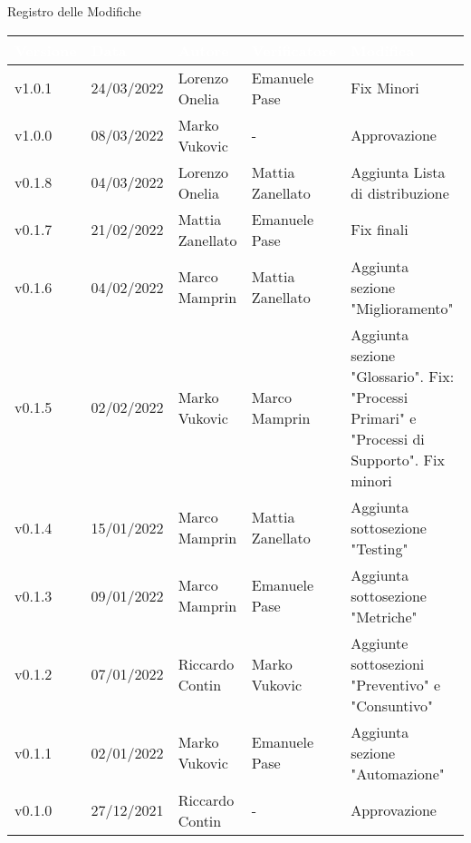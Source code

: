 \begin{center}
  \huge{Registro delle Modifiche}
\end{center}

\renewcommand\arraystretch{1,5}
{\centering
\begin{longtable}{|C{1.8cm}|C{2.1cm}|C{2cm}|C{2.4cm}|L{4.4cm}|}
  \hline
  \textcolor[HTML]{FFFFFF}{\textbf{Versione}} & \textcolor[HTML]{FFFFFF}{\textbf{Data}} & \textcolor[HTML]{FFFFFF}{\textbf{Autore}}  & \textcolor[HTML]{FFFFFF}{\textbf{Verificatore}} & \textcolor[HTML]{FFFFFF}{\textbf{Modifica}}    \\ \hline
  v1.0.1      & 24/03/2022    & Lorenzo Onelia  & Emanuele Pase    & Fix Minori                \\ \hline
  v1.0.0     & 08/03/2022   & Marko Vukovic & - & Approvazione     \\ \hline
  v0.1.8      & 04/03/2022    & Lorenzo Onelia  & Mattia Zanellato     & Aggiunta Lista di distribuzione                  \\ \hline
  v0.1.7     & 21/02/2022    & Mattia Zanellato & Emanuele Pase         & Fix finali   \\ \hline
  v0.1.6     & 04/02/2022    & Marco Mamprin    & Mattia Zanellato      & Aggiunta sezione "Miglioramento"   \\ \hline
  v0.1.5     & 02/02/2022    & Marko Vukovic    & Marco Mamprin         & Aggiunta sezione "Glossario". Fix: "Processi Primari" e "Processi di Supporto". Fix minori   \\ \hline
  v0.1.4     & 15/01/2022    & Marco Mamprin    & Mattia Zanellato      & Aggiunta sottosezione "Testing"  \\ \hline
  v0.1.3     & 09/01/2022    & Marco Mamprin    & Emanuele Pase         & Aggiunta sottosezione "Metriche"  \\ \hline
  v0.1.2     & 07/01/2022    & Riccardo Contin  & Marko Vukovic         & Aggiunte sottosezioni "Preventivo" e "Consuntivo"  \\ \hline
  v0.1.1     & 02/01/2022    & Marko Vukovic    & Emanuele Pase         & Aggiunta sezione "Automazione"  \\ \hline
  v0.1.0     & 27/12/2021    & Riccardo Contin  & -                     & Approvazione  \\ \hline

\end{longtable}}
